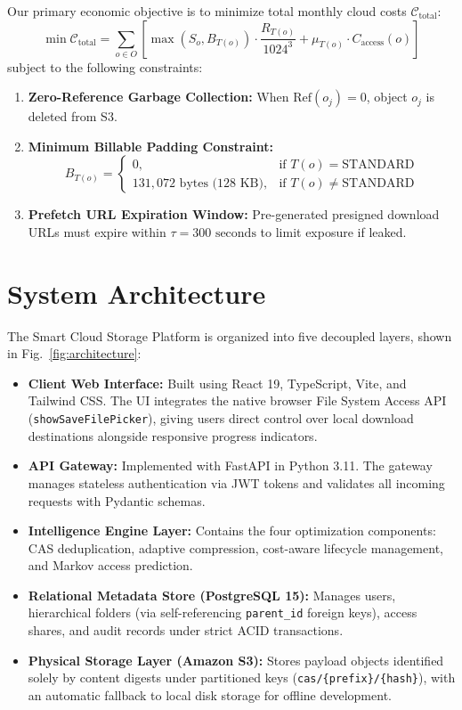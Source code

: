 \documentclass[conference]{IEEEtran}
\begin{document}
Our primary economic objective is to minimize total monthly cloud costs $\mathcal{C}_{\text{total}}$:
\begin{equation}
\min \mathcal{C}_{\text{total}} = \sum_{o \in O} \left[ \max(S_o, B_{T(o)}) \cdot \frac{R_{T(o)}}{1024^3} + \mu_{T(o)} \cdot C_{\text{access}}(o) \right]
\end{equation}
subject to the following constraints:
\begin{enumerate}
    \item \textbf{Zero-Reference Garbage Collection:} When $\text{Ref}(o_j) = 0$, object $o_j$ is deleted from S3.
    \item \textbf{Minimum Billable Padding Constraint:}
    \begin{equation}
    B_{T(o)} = \begin{cases} 
    0, & \text{if } T(o) = \text{STANDARD} \\ 
    131,072\text{ bytes (128~KB)}, & \text{if } T(o) \neq \text{STANDARD} 
    \end{cases}
    \end{equation}
    \item \textbf{Prefetch URL Expiration Window:} Pre-generated presigned download URLs must expire within $\tau = 300\text{ seconds}$ to limit exposure if leaked.
\end{enumerate}

\section{System Architecture}
The Smart Cloud Storage Platform is organized into five decoupled layers, shown in Fig.~\ref{fig:architecture}:
\begin{itemize}
    \item \textbf{Client Web Interface:} Built using React 19, TypeScript, Vite, and Tailwind CSS. The UI integrates the native browser File System Access API (\texttt{showSaveFilePicker}), giving users direct control over local download destinations alongside responsive progress indicators.
    \item \textbf{API Gateway:} Implemented with FastAPI in Python 3.11. The gateway manages stateless authentication via JWT tokens and validates all incoming requests with Pydantic schemas.
    \item \textbf{Intelligence Engine Layer:} Contains the four optimization components: CAS deduplication, adaptive compression, cost-aware lifecycle management, and Markov access prediction.
    \item \textbf{Relational Metadata Store (PostgreSQL 15):} Manages users, hierarchical folders (via self-referencing \texttt{parent\_id} foreign keys), access shares, and audit records under strict ACID transactions.
    \item \textbf{Physical Storage Layer (Amazon S3):} Stores payload objects identified solely by content digests under partitioned keys (\texttt{cas/\{prefix\}/\{hash\}}), with an automatic fallback to local disk storage for offline development.
\end{itemize}
\end{document}
